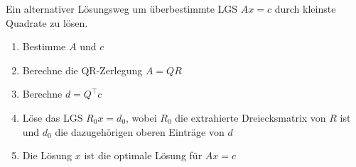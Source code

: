 \begin{tcolorbox}[colback=gray!30, colframe=gray!80, title=Kleinste Quadrate mit QR-Zerlegung]
    Ein alternativer Lösungsweg um überbestimmte LGS \( Ax=c\) durch kleinste Quadrate zu lösen. 
    \begin{enumerate}
        \item Bestimme \( A \) und \( c \)
        \item Berechne die QR-Zerlegung \( A = QR \)
        \item Berechne \( d = Q^\top c \)
        \item Löse das LGS \( R_0 x = d_0 \), wobei \( R_0 \) die extrahierte Dreiecksmatrix von \( R \) ist und \( d_0 \) die dazugehörigen oberen Einträge von \( d \)
        \item Die Lösung \( x \) ist die optimale Lösung für \( Ax = c \)
    \end{enumerate}
\end{tcolorbox}